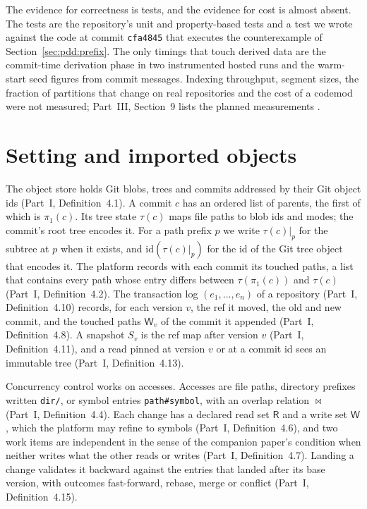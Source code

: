 \documentclass[11pt,letterpaper]{article}
\theoremstyle{definition}
\theoremstyle{remark}
\newcommand{\id}{\mathrm{id}}
\newcommand{\tree}{\tau}
\newcommand{\R}{\mathsf{R}}
\newcommand{\W}{\mathsf{W}}
\DeclareRobustCommand{\code}[1]{{\def\_{\textunderscore\allowbreak}\texttt{#1}}}
\begin{document}
The evidence for correctness is tests, and the evidence for cost is almost absent. The tests are the repository's unit and property-based tests and a test we wrote against the code at commit \code{cfa4845} that executes the counterexample of Section~\ref{sec:pdd:prefix}. The only timings that touch derived data are the commit-time derivation phase in two instrumented hosted runs and the warm-start seed figures from commit messages. Indexing throughput, segment sizes, the fraction of partitions that change on real repositories and the cost of a codemod were not measured; Part~III, Section~9 lists the planned measurements \cite{long2026partIII}.

\section{Setting and imported objects}
\label{sec:pdd:setting}

The object store holds Git blobs, trees and commits addressed by their Git object ids (Part~I, Definition~4.1). A commit $c$ has an ordered list of parents, the first of which is $\pi_1(c)$. Its tree state $\tree(c)$ maps file paths to blob ids and modes; the commit's root tree encodes it. For a path prefix $p$ we write $\tree(c)|_p$ for the subtree at $p$ when it exists, and $\id(\tree(c)|_p)$ for the id of the Git tree object that encodes it. The platform records with each commit its touched paths, a list that contains every path whose entry differs between $\tree(\pi_1(c))$ and $\tree(c)$ (Part~I, Definition~4.2). The transaction log $(e_1,\ldots,e_n)$ of a repository (Part~I, Definition~4.10) records, for each version $v$, the ref it moved, the old and new commit, and the touched paths $\W_v$ of the commit it appended (Part~I, Definition~4.8). A snapshot $S_v$ is the ref map after version $v$ (Part~I, Definition~4.11), and a read pinned at version $v$ or at a commit id sees an immutable tree (Part~I, Definition~4.13).

Concurrency control works on accesses. Accesses are file paths, directory prefixes written \code{dir/}, or symbol entries \code{path\#symbol}, with an overlap relation $\bowtie$ (Part~I, Definition~4.4). Each change has a declared read set $\R$ and a write set $\W$, which the platform may refine to symbols (Part~I, Definition~4.6), and two work items are independent in the sense of the companion paper's \cite[Eq.~1]{long2026inversion} condition when neither writes what the other reads or writes (Part~I, Definition~4.7). Landing a change validates it backward against the entries that landed after its base version, with outcomes fast-forward, rebase, merge or conflict (Part~I, Definition~4.15).
\end{document}
